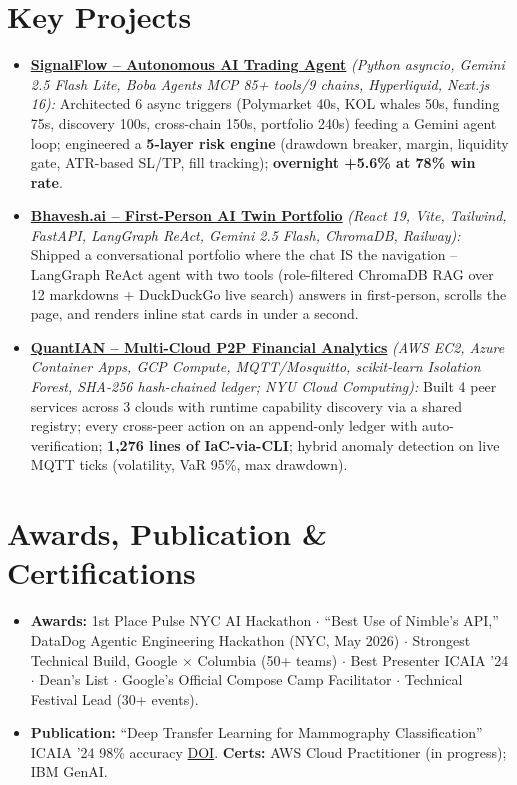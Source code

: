 \documentclass[10pt, letterpaper]{article}
\begin{document}
\vspace{-5pt}
\section{Key Projects}
\begin{itemize}
    \item \href{https://github.com/bhaveshgupta01/signalflow}{\textbf{SignalFlow -- Autonomous AI Trading Agent}} \textit{(Python asyncio, Gemini 2.5 Flash Lite, Boba Agents MCP 85+ tools/9 chains, Hyperliquid, Next.js 16):} Architected 6 async triggers (Polymarket 40s, KOL whales 50s, funding 75s, discovery 100s, cross-chain 150s, portfolio 240s) feeding a Gemini agent loop; engineered a \textbf{5-layer risk engine} (drawdown breaker, margin, liquidity gate, ATR-based SL/TP, fill tracking); \textbf{overnight +5.6\% at 78\% win rate}.
    \item \href{https://libralpanda.vercel.app}{\textbf{Bhavesh.ai -- First-Person AI Twin Portfolio}} \textit{(React 19, Vite, Tailwind, FastAPI, LangGraph ReAct, Gemini 2.5 Flash, ChromaDB, Railway):} Shipped a conversational portfolio where the chat IS the navigation -- LangGraph ReAct agent with two tools (role-filtered ChromaDB RAG over 12 markdowns + DuckDuckGo live search) answers in first-person, scrolls the page, and renders inline stat cards in under a second.
    \item \href{https://github.com/bhaveshgupta01/CrossCloudAnalyser}{\textbf{QuantIAN -- Multi-Cloud P2P Financial Analytics}} \textit{(AWS EC2, Azure Container Apps, GCP Compute, MQTT/Mosquitto, scikit-learn Isolation Forest, SHA-256 hash-chained ledger; NYU Cloud Computing):} Built 4 peer services across 3 clouds with runtime capability discovery via a shared registry; every cross-peer action on an append-only ledger with auto-verification; \textbf{1,276 lines of IaC-via-CLI}; hybrid anomaly detection on live MQTT ticks (volatility, VaR 95\%, max drawdown).
\end{itemize}

\vspace{-5pt}
\section{Awards, Publication \& Certifications}
\begin{itemize}
    \item \textbf{Awards:} 1st Place Pulse NYC AI Hackathon $\cdot$ \textquotedblleft Best Use of Nimble's API,\textquotedblright{} DataDog Agentic Engineering Hackathon (NYC, May 2026) $\cdot$ Strongest Technical Build, Google $\times$ Columbia (50+ teams) $\cdot$ Best Presenter ICAIA '24 $\cdot$ Dean's List $\cdot$ Google's Official Compose Camp Facilitator $\cdot$ Technical Festival Lead (30+ events).
    \item \textbf{Publication:} \textquotedblleft Deep Transfer Learning for Mammography Classification\textquotedblright{} \textbar{} ICAIA '24 \textbar{} 98\% accuracy \textbar{} \href{https://doi.org/10.24874/PES.SI.25.03A.007}{DOI}. \textbf{Certs:} AWS Cloud Practitioner (in progress); IBM GenAI.
\end{itemize}
\end{document}
